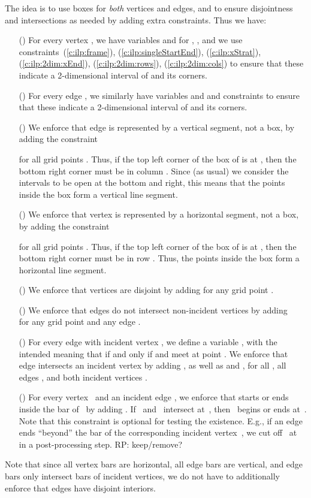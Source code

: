 \documentclass[runningheads]{llncs}
\newcommand{\comment}[1]{{\color{red} #1}}
\newcounter{constr}
\newcommand{\constr}[1]{\noindent \refstepcounter{constr}\theconstr #1}
\begin{document}
The idea is to use boxes for {\em both} vertices
and edges, and to ensure disjointness and intersections as needed
by adding extra constraints.
Thus we have:
\begin{itemize}
\item[(\constr{\label{c:vis:vert}})] For every vertex , we have variables  and
	 for , ,
	and we use constraints~(\ref{c:ilp:frame}),
	(\ref{c:ilp:singleStartEnd}), (\ref{c:ilp:xStrat}),
	(\ref{c:ilp:2dim:xEnd}), (\ref{c:ilp:2dim:rows}), (\ref{c:ilp:2dim:cols})
	 to ensure that these
	indicate a 2-dimensional interval  of  and its corners.
\item[(\constr{\label{c:vis:edges}})] For every edge , we similarly have variables  and
	 and constraints
to ensure that these
	indicate a 2-dimensional interval  of  and its corners.
\item[(\constr{\label{c:vis:eVert}})]
	We enforce that edge  is represented by a vertical segment, not a box,
	by adding the constraint 

	for all grid points .
	Thus, if the top left corner of the box of  is at ,
	then the bottom right corner must be in column . 
	Since (as usual) we consider the intervals to be
	open at the bottom and right, this means that the points
	inside the box form a vertical line segment.
\item[(\constr{\label{c:vis:vHor}})]
	We enforce that vertex  is represented by a horizontal segment, not a box,
	by adding the constraint 

	for all grid points .
	Thus, if the top left corner of the box of  is at ,
	then the bottom right corner must be in row .
	Thus, the points inside the box form a horizontal line segment.
\item[(\constr{\label{c:vis:vDisj}})]
	We enforce that vertices are disjoint by adding
	 for any grid point .
\item[(\constr{\label{c:vis:evNonAdj}})]
 	We enforce that edges do not intersect non-incident vertices
	by adding\\  
	for any grid point  and any edge .		 	
\item[(\constr{\label{c:vis:evAdj}})]
	For every edge  with incident vertex , we define a
	variable , with the intended meaning that
	 if and only if  and  meet at point .
	We enforce that edge  intersects an incident vertex  by adding
	, as well as
	 and ,
	for all , all edges , and both incident vertices .
\item[(\constr{\label{c:vis:eBeginEndAtV}})]
	For every vertex~ and an incident edge ,
	we enforce that  starts or ends inside the bar of~
	by adding .
	If~ and~ intersect at~, then~ begins or ends at~.
	Note that this constraint is optional for testing the existence.
	E.g., if an edge~ ends ``beyond'' the bar of the corresponding incident vertex~,
	we cut off~ at~ in a post-processing step. \comment{RP: keep/remove?}
\end{itemize}
Note that since all vertex bars are horizontal, all edge bars are vertical,
and edge bars only intersect bars of incident vertices,
we do not have to additionally enforce that edges have disjoint interiors.
\par
\end{document}
